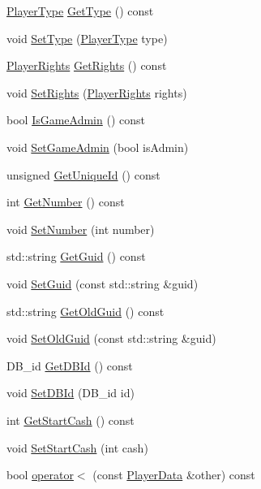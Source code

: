 \begin{DoxyCompactItemize}
\item 
\hyperlink{playerdata_8h_abe590f3c9109f404f003d5d7e4f0fccf}{Player\-Type} \hyperlink{class_player_data_abfb06f847beee982e86ad29d03edc3b5}{Get\-Type} () const 
\item 
void \hyperlink{class_player_data_a8a32bc6cc032cccbab4d761054f8578a}{Set\-Type} (\hyperlink{playerdata_8h_abe590f3c9109f404f003d5d7e4f0fccf}{Player\-Type} type)
\item 
\hyperlink{playerdata_8h_ac0c72aca5c5ceabb2abbcd2d2c02aba6}{Player\-Rights} \hyperlink{class_player_data_a6ec702f92553198aabca8a235dc2b995}{Get\-Rights} () const 
\item 
void \hyperlink{class_player_data_a6496cec308484ed8f3ef100721d6461d}{Set\-Rights} (\hyperlink{playerdata_8h_ac0c72aca5c5ceabb2abbcd2d2c02aba6}{Player\-Rights} rights)
\item 
bool \hyperlink{class_player_data_a0203b2a5c2042d46f0ca838c94db88fc}{Is\-Game\-Admin} () const 
\item 
void \hyperlink{class_player_data_a926cfc7ff5a727ae5c0e072f0a1e947e}{Set\-Game\-Admin} (bool is\-Admin)
\item 
unsigned \hyperlink{class_player_data_a9922629a2ab29426703454a3b1554e38}{Get\-Unique\-Id} () const 
\item 
int \hyperlink{class_player_data_a0597b5d7c731ad08862eff9f5fb48754}{Get\-Number} () const 
\item 
void \hyperlink{class_player_data_acc626969fae365d9a85134c1602620de}{Set\-Number} (int number)
\item 
std\-::string \hyperlink{class_player_data_a84d85d3024a526f9887bf50e20c504e4}{Get\-Guid} () const 
\item 
void \hyperlink{class_player_data_ae6df82d891bb33d3d6ebe7e42d9bff07}{Set\-Guid} (const std\-::string \&guid)
\item 
std\-::string \hyperlink{class_player_data_af3ec6bf093ef6ba0d2bc1497907d8c6c}{Get\-Old\-Guid} () const 
\item 
void \hyperlink{class_player_data_a575e319875bdd901034d54be2f88ea12}{Set\-Old\-Guid} (const std\-::string \&guid)
\item 
D\-B\-\_\-id \hyperlink{class_player_data_a574ecee71638104326860bfa4438dcf5}{Get\-D\-B\-Id} () const 
\item 
void \hyperlink{class_player_data_a0f20856a42691cc4f917763307f895e0}{Set\-D\-B\-Id} (D\-B\-\_\-id id)
\item 
int \hyperlink{class_player_data_a54eab50fb80ec7f18ce1777c3632a73d}{Get\-Start\-Cash} () const 
\item 
void \hyperlink{class_player_data_ab0b58b77fb2366c31ff902cd91117919}{Set\-Start\-Cash} (int cash)
\item 
bool \hyperlink{class_player_data_afa03422cfe10bf02083f65746e2fb723}{operator$<$} (const \hyperlink{class_player_data}{Player\-Data} \&other) const 
\end{DoxyCompactItemize}
